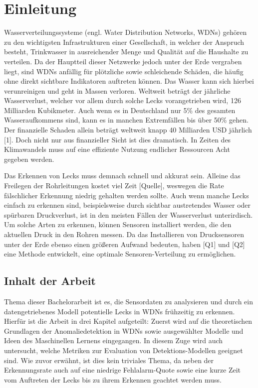 \chapter{Einleitung}

Wasserverteilungssysteme (engl. Water Distribution Networks, WDNs) gehören zu den wichtigsten Infrastrukturen
 einer Gesellschaft, in welcher der Anspruch besteht, Trinkwasser in ausreichender Menge und Qualität auf die
 Haushalte zu verteilen. Da der Hauptteil dieser Netzwerke jedoch unter der Erde vergraben liegt, sind WDNs
 anfällig für plötzliche sowie schleichende Schäden, die häufig ohne direkt sichtbare Indikatoren
 auftreten können. Das Wasser kann sich hierbei verunreinigen und geht in Massen verloren. Weltweit beträgt
 der jährliche Wasserverlust, welcher vor allem durch solche Lecks vorangetrieben wird, 126 Milliarden
 Kubikmeter. Auch wenn es in Deutschland nur 5\% des gesamten Wasseraufkommens sind, kann es in manchen
 Extremfällen bis über 50\% gehen. Der finanzielle Schaden allein beträgt weltweit knapp 40 Milliarden USD
 jährlich [1]. Doch nicht nur aus finanzieller Sicht ist dies dramatisch. In Zeiten des Klimawandels muss auf
 eine effiziente Nutzung endlicher Ressourcen Acht gegeben werden.

Das Erkennen von Lecks muss demnach schnell und akkurat sein. Alleine das Freilegen der Rohrleitungen kostet viel
 Zeit [Quelle], weswegen die Rate fälschlicher Erkennung niedrig gehalten werden sollte. Auch wenn manche Lecks
 einfach zu erkennen sind, beispielsweise durch sichtbar austretendes Wasser oder spürbaren Druckverlust, ist in
 den meisten Fällen der Wasserverlust unterirdisch. Um solche Arten zu erkennen, können Sensoren installiert
 werden, die den aktuellen Druck in den Rohren messen. Da das Installieren von Drucksensoren unter der Erde
 ebenso einen größeren Aufwand bedeuten, haben [Q1] und [Q2] eine Methode entwickelt, eine optimale
 Sensoren-Verteilung zu ermöglichen.

\section*{Inhalt der Arbeit}

Thema dieser Bachelorarbeit ist es, die Sensordaten zu analysieren und durch ein datengetriebenes Modell
 potentielle Lecks in WDNs frühzeitig zu erkennen. Hierfür ist die Arbeit in drei Kapitel aufgeteilt:
 Zuerst wird auf die theoretischen Grundlagen der Anomaliedetektion in WDNs sowie ausgewählter Modelle und
 Ideen des Maschinellen Lernens eingegangen.
In diesem Zuge wird auch untersucht, welche Metriken zur Evaluation von Detektions-Modellen geeignet sind.
Wie zuvor erwähnt, ist dies kein triviales Thema, da neben der Erkennungsrate auch auf eine niedrige
 Fehlalarm-Quote sowie eine kurze Zeit vom Auftreten der Lecks bis zu ihrem Erkennen geachtet werden muss.

